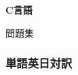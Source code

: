 \documentclass[12pt,a4j]{jarticle}
\begin{document}

\begin{titlepage}
\mbox{}

\vfill

 \Huge\bfseries
 \hfill C言語

 \hfill 問題集
 
 \bigskip

 \Large




\vfill

\mbox{}

\end{titlepage}

\thispagestyle{empty}
\newpage






\subsubsection*{単語英日対訳}
\end{document}
